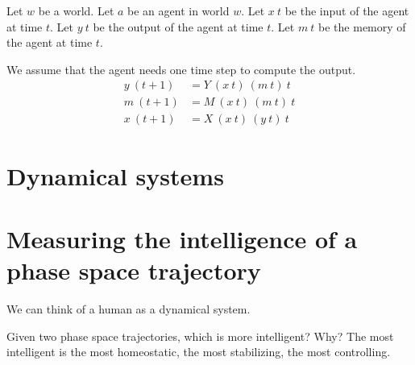 Let \(w\) be a world.
Let \(a\) be an agent in world \(w\).
Let \(x~t\) be the input of the agent at time \(t\).
Let \(y~t\) be the output of the agent at time \(t\).
Let \(m~t\) be the memory of the agent at time \(t\).

We assume that the agent needs one time step to compute the output.
\begin{align}
    y~(t+1) &= Y~(x~t)~(m~t)~t
    \\
    m~(t+1) &= M~(x~t)~(m~t)~t
    \\
    x~(t+1) &= X~(x~t)~(y~t)~t
\end{align}

\section{Dynamical systems}

\section{Measuring the intelligence of a phase space trajectory}

We can think of a human as a dynamical system.

Given two phase space trajectories,
which is more intelligent?
Why?
The most intelligent is the most homeostatic, the most stabilizing, the most controlling.
